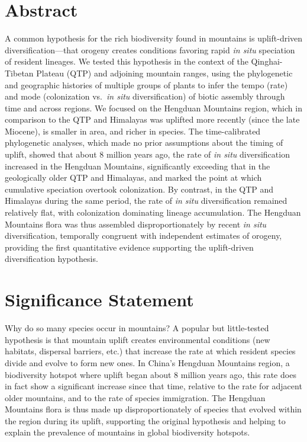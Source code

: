 \section*{Abstract}

A common hypothesis for the rich biodiversity found in mountains is
uplift-driven diversification---that orogeny creates conditions
favoring rapid \textit{in situ} speciation of resident lineages. We
tested this hypothesis in the context of the Qinghai-Tibetan Plateau
(QTP) and adjoining mountain ranges, using the phylogenetic and
geographic histories of multiple groups of plants to infer the tempo
(rate) and mode (colonization vs.\ \textit{in situ} diversification)
of biotic assembly through time and across regions. We focused on the
Hengduan Mountains region, which in comparison to the QTP and
Himalayas was uplifted more recently (since the late Miocene), is
smaller in area, and richer in species. The time-calibrated
phylogenetic analyses, which made no prior assumptions about the
timing of uplift, showed that about 8 million years ago, the rate of
\textit{in situ} diversification increased in the Hengduan Mountains,
significantly exceeding that in the geologically older QTP and
Himalayas, and marked the point at which cumulative speciation
overtook colonization. By contrast, in the QTP and Himalayas during
the same period, the rate of \textit{in situ} diversification remained
relatively flat, with colonization dominating lineage
accumulation. The Hengduan Mountains flora was thus assembled
disproportionately by recent \textit{in situ} diversification,
temporally congruent with independent estimates of orogeny, providing
the first quantitative evidence supporting the uplift-driven
diversification hypothesis.

\newpage

\section*{Significance Statement}

Why do so many species occur in mountains? A popular but little-tested
hypothesis is that mountain uplift creates environmental conditions
(new habitats, dispersal barriers, etc.) that increase the rate at
which resident species divide and evolve to form new ones. In China's
Hengduan Mountains region, a biodiversity hotspot where uplift began
about 8 million years ago, this rate does in fact show a significant
increase since that time, relative to the rate for adjacent older
mountains, and to the rate of species immigration. The Hengduan
Mountains flora is thus made up disproportionately of species that
evolved within the region during its uplift, supporting the original
hypothesis and helping to explain the prevalence of mountains in
global biodiversity hotspots.



